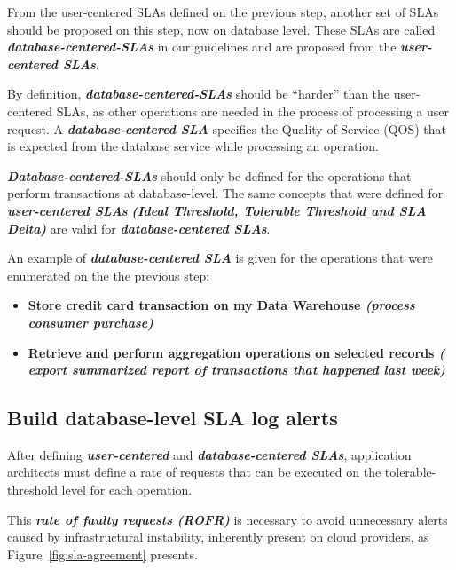 From the user-centered SLAs defined on the previous step, another set of SLAs should be proposed on this step, now on database level. These SLAs are called \textbf{\textit{database-centered-SLAs}} in our guidelines and are proposed from the \textbf{\textit{user-centered SLAs}}.

By definition, \textbf{\textit{database-centered-SLAs}} should be ``harder'' than the user-centered SLAs, as other operations are needed in the process of processing a user request. A \textbf{\textit{database-centered SLA}} specifies the Quality-of-Service (QOS) that is expected from the database service while processing an operation.

\textbf{ \textit{Database-centered-SLAs}} should only be defined for the operations that perform transactions at database-level. The same concepts that were defined for \textbf{\textit{user-centered SLAs}} \textbf{\textit{(Ideal Threshold, Tolerable Threshold and SLA Delta)}} are valid for \textbf{\textit{database-centered SLAs}}.

An example of \textbf{\textit{database-centered SLA}} is given for the operations that were enumerated on the the previous step: 

\begin{itemize}
\item{ 
\textbf{Store credit card transaction on my Data Warehouse \textit{(process consumer purchase)}}
}

\item{
\textbf{Retrieve and perform aggregation operations on selected records \textit{( export summarized report of transactions that happened last week)}}
}
\end{itemize}

\subsection{Build database-level SLA log alerts}

After defining \textbf{\textit{user-centered}} and \textbf{\textit{database-centered SLAs}}, application architects must define a rate of requests that can be executed on the tolerable-threshold level for each operation.

This \textbf{\textit{rate of faulty requests (ROFR)}} is necessary to avoid unnecessary alerts caused by infrastructural instability, inherently present on cloud providers, as Figure~\ref{fig:sla-agreement} presents.

